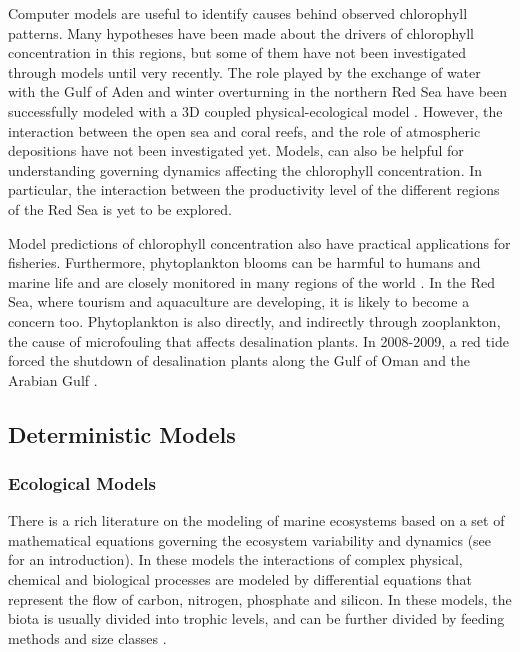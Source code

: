 Computer models are useful to identify causes behind observed chlorophyll
patterns.  Many hypotheses have been made about the drivers of chlorophyll
concentration in this regions, but some of them have not been investigated
through models until very recently. The role played by the exchange of water
with the Gulf of Aden and winter overturning in the northern Red Sea have been
successfully modeled with a 3D coupled physical-ecological model
\citep{Yao2014, Yao2014b, Triantafyllou2014}.  However, the interaction between
the open sea and coral reefs, and the role of atmospheric depositions have not
been investigated yet.  Models, can also be helpful for understanding governing
dynamics affecting the chlorophyll concentration. In particular, the
interaction between the productivity level of the different regions of the Red
Sea is yet to be explored.

Model predictions of chlorophyll concentration also have practical applications
for fisheries. Furthermore, phytoplankton blooms can be harmful to humans and
marine life and are closely monitored in many regions of the world
\citep{Pettersson2013}. In the Red Sea, where tourism and aquaculture are
developing, it is likely to become a concern too. Phytoplankton is also
directly, and indirectly through zooplankton, the cause of microfouling that
affects desalination plants. In 2008-2009, a red tide forced the shutdown of
desalination plants along the Gulf of Oman and the Arabian Gulf
\citep{Richlen2010}.


\subsection{Deterministic Models}

\subsubsection{Ecological Models}

There is a rich literature on the modeling of marine ecosystems based on a set
of mathematical equations governing the ecosystem variability and dynamics (see
\citet{Fennel2004} for an introduction). In these models the interactions of
complex physical, chemical and biological processes are modeled by differential
equations that represent the flow of carbon, nitrogen, phosphate and silicon.
In these models, the biota is usually divided into trophic levels, and can be
further divided by feeding methods and size classes \citep{Baretta1995,
Triantafyllou2014}.

